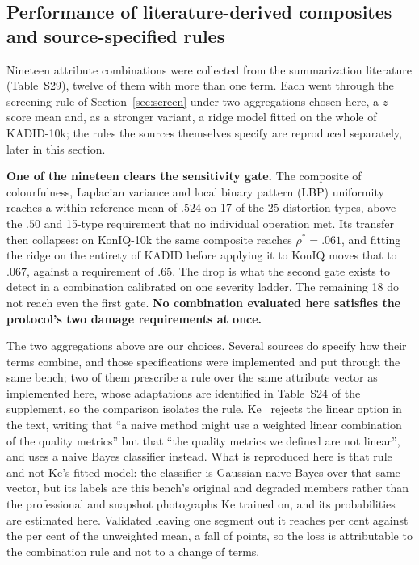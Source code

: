\subsection{Performance of literature-derived composites and source-specified
rules}\label{sec:combinations}

Nineteen attribute combinations were collected from the summarization literature
(Table~S29), twelve of them with more than one term. Each went through the screening rule of
Section~\ref{sec:screen} under two aggregations chosen here, a $z$-score mean and, as a
stronger variant, a ridge model fitted on the whole of KADID-10k; the rules the sources
themselves specify are reproduced separately, later in this section.

\textbf{One of the nineteen clears the sensitivity gate.} The composite of colourfulness, Laplacian variance and local binary pattern (LBP)
uniformity
reaches a within-reference mean of $.524$ on 17 of the 25 distortion types, above the $.50$
and 15-type requirement that no individual operation met. Its transfer then collapses: on
KonIQ-10k the same composite reaches $\rho^{*}=.061$, and fitting the ridge on the entirety
of KADID before applying it to KonIQ moves that to $.067$, against a requirement of $.65$.
The drop is what the second gate exists to detect in a combination calibrated on one
severity ladder. The remaining 18 do not reach even the first gate. \textbf{No combination
evaluated here satisfies the protocol's two damage requirements at once.}

The two aggregations above are our choices. Several sources do specify how their terms
combine, and those specifications were implemented and put through the same bench; two of
them prescribe a rule over the same attribute vector as implemented here, whose adaptations
are identified in Table~S24 of the supplement, so the comparison isolates the rule. Ke~\citep{ke2006highlevel} rejects the linear option in the text, writing
that ``a naive method might
use a weighted linear combination of the quality metrics'' but that ``the quality metrics we
defined are not linear'', and uses a naive Bayes classifier instead. What is reproduced
here is that rule and not Ke's fitted model: the classifier is Gaussian naive Bayes over that
same vector, but its labels are this bench's original and degraded members rather than
the professional and snapshot photographs Ke trained on, and its probabilities are estimated
here. Validated leaving one segment out it reaches \regraKe{} per cent against the
\regraMedia{} per cent of the unweighted mean, a fall of \regraKeQueda{} points, so the loss
is attributable to the combination rule and not to a change of terms.

